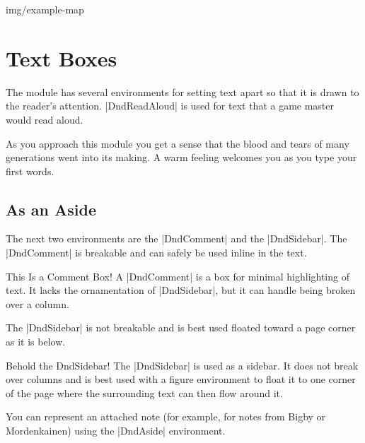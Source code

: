 \documentclass[letterpaper,twocolumn,openany,nodeprecatedcode,srd=5.1]{dndbook}
\begin{document}
\begin{DndMap}[caption=Hommlet and Environs, label=hommlet,
                scale={1 square = 5 feet}, compass]{img/example-map}
\end{DndMap}

\chapter{Text Boxes}

The module has several environments for setting text apart so that it is drawn to the reader's attention. |DndReadAloud| is used for text that a game master would read aloud.

\begin{DndReadAloud}
  As you approach this module you get a sense that the blood and tears of many generations went into its making. A warm feeling welcomes you as you type your first words.
\end{DndReadAloud}

\section{As an Aside}
The next two environments are the |DndComment| and the |DndSidebar|. The |DndComment| is breakable and can safely be used inline in the text.

\begin{DndComment}{This Is a Comment Box!}
  A |DndComment| is a box for minimal highlighting of text. It lacks the ornamentation of |DndSidebar|, but it can handle being broken over a column.
\end{DndComment}

The |DndSidebar| is not breakable and is best used floated toward a page corner as it is below.

\begin{DndSidebar}[float=!b]{Behold the DndSidebar!}
  The |DndSidebar| is used as a sidebar. It does not break over columns and is best used with a figure environment to float it to one corner of the page where the surrounding text can then flow around it.
\end{DndSidebar}

You can represent an attached note (for example, for notes from Bigby or Mordenkainen) using the |DndAside| environment.
\end{document}
